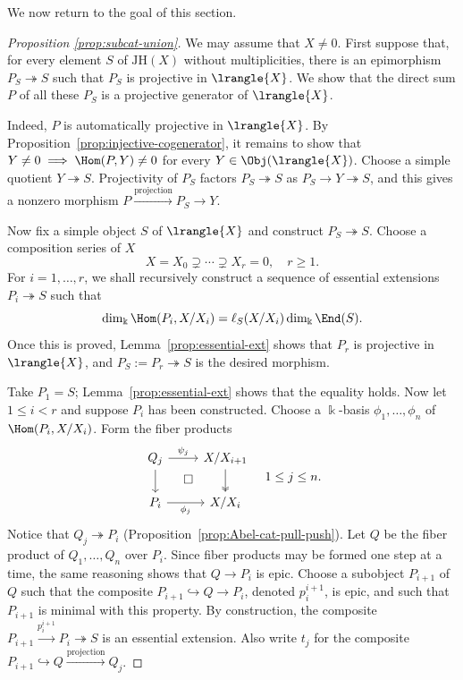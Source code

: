 We now return to the goal of this section.

\begin{proof}[Proposition \ref{prop:subcat-union}]
	We may assume that $X\neq0$. First suppose that, for every element $S$ of $\mathrm{JH}(X)$ without multiplicities, there is an epimorphism $P_S\twoheadrightarrow S$ such that $P_S$ is projective in $\lrangle{X}$. We show that the direct sum $P$ of all these $P_S$ is a projective generator of $\lrangle{X}$.

	Indeed, $P$ is automatically projective in $\lrangle{X}$. By Proposition~\ref{prop:injective-cogenerator}, it remains to show that
	$Y\neq0\implies\Hom(P,Y)\neq0$ for every $Y\in\Obj(\lrangle{X})$. Choose a simple quotient $Y\twoheadrightarrow S$. Projectivity of $P_S$ factors $P_S\twoheadrightarrow S$ as
	$P_S\to Y\twoheadrightarrow S$, and this gives a nonzero morphism
	$P\xrightarrow{\text{projection}}P_S\to Y$.

	Now fix a simple object $S$ of $\lrangle{X}$ and construct $P_S\twoheadrightarrow S$. Choose a composition series of $X$
	\[ X = X_0 \supsetneq \cdots \supsetneq X_r = 0, \quad r \geq 1. \]
	For $i=1,\ldots,r$, we shall recursively construct a sequence of essential extensions $P_i\twoheadrightarrow S$ such that
	\[ \dim_{\Bbbk} \Hom(P_i, X/X_i) = \ell_S(X/X_i) \dim_{\Bbbk} \End(S). \]
	Once this is proved, Lemma~\ref{prop:essential-ext} shows that $P_r$ is projective in $\lrangle{X}$, and $P_S:=P_r\twoheadrightarrow S$ is the desired morphism.

	Take $P_1=S$; Lemma~\ref{prop:essential-ext} shows that the equality holds. Now let $1\leq i<r$ and suppose $P_i$ has been constructed. Choose a $\Bbbk$-basis $\phi_1,\ldots,\phi_n$ of $\Hom(P_i,X/X_i)$. Form the fiber products
	\[\begin{tikzcd}
		Q_j \arrow[d] \arrow[r, "{\psi_j}"] & X/X_{i+1} \arrow[twoheadrightarrow, d] \\
		P_i \arrow[r, "{\phi_j}"'] & X/X_i \arrow[phantom, lu, "\Box" description]
	\end{tikzcd} \quad 1 \leq j \leq n.\]
	Notice that $Q_j\twoheadrightarrow P_i$ (Proposition~\ref{prop:Abel-cat-pull-push}). Let $Q$ be the fiber product of $Q_1,\ldots,Q_n$ over $P_i$. Since fiber products may be formed one step at a time, the same reasoning shows that $Q\to P_i$ is epic. Choose a subobject $P_{i+1}$ of $Q$ such that the composite
	$P_{i+1}\hookrightarrow Q\to P_i$, denoted $p^{i+1}_i$, is epic, and such that $P_{i+1}$ is minimal with this property. By construction, the composite
	$P_{i+1}\xrightarrow{p^{i+1}_i}P_i\twoheadrightarrow S$ is an essential extension. Also write $t_j$ for the composite
	$P_{i+1}\hookrightarrow Q\xrightarrow{\text{projection}}Q_j$.


\end{proof}
